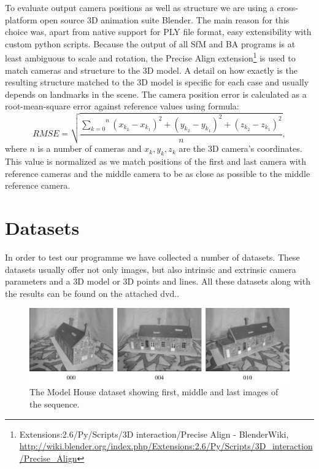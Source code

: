 \vspace{.5cm}
To evaluate output camera positions as well as structure we are using a cross-platform open source 3D animation suite Blender. The main reason for this choice was, apart from native support for PLY file format, easy extensibility with custom python scripts. Because the output of all SfM and BA programs is at least ambiguous to scale and rotation, the Precise Align extension\footnote{Extensions:2.6/Py/Scripts/3D interaction/Precise Align - BlenderWiki, \url{http://wiki.blender.org/index.php/Extensions:2.6/Py/Scripts/3D_interaction/Precise_Align}} is used to match cameras and structure to the 3D model. A detail on how exactly is the resulting structure matched to the 3D model is specific for each case and usually depends on landmarks in the scene. The camera position error is calculated as a root-mean-square error against reference values using formula:
\begin{equation}
	RMSE=\sqrt{\frac{\overset{n}{\underset{k=0}{\sum}} (x_{k_2}-x_{k_1})^2 + (y_{k_2}-y_{k_1})^2 + (z_{k_2}-z_{k_1})^2}{n}},
	\label{eq:RMSE}
\end{equation}
where $n$ is a number of cameras and $x_{k}, y_k, z_k$ are the 3D camera's coordinates. This value is normalized as we match positions of the first and last camera with reference cameras and the middle camera to be as close as possible to the middle reference camera.

\section{Datasets}
\label{sec:experiments-datasets}
In order to test our programme we have collected a number of datasets. These datasets usually offer not only images, but also intrinsic and extrinsic camera parameters and a 3D model or 3D points and lines. All these datasets along with the results can be found on the attached dvd..

\begin{figure}[ht]
	\begin{center}
		\includegraphics[keepaspectratio,width=\textwidth]{fig/experiments-model-house.pdf}
	\end{center}
	\caption{The Model House dataset showing first, middle and last images of the sequence.}
	\label{fig:modelhouse}
\end{figure}
